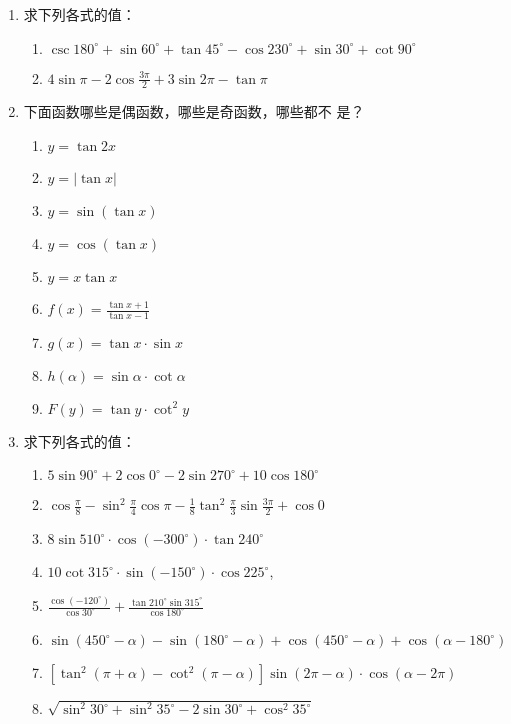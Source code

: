 \begin{enumerate}
\item 求下列各式的值：
\begin{enumerate}
    \item $\csc180^{\circ}+\sin60^{\circ}+\tan45^{\circ}-\cos230^{\circ}+\sin30^{\circ}
+\cot90^{\circ}$
    \item $4\sin\pi-2\cos\frac{3\pi}{2}+3\sin2\pi -\tan\pi$
\end{enumerate}

\item 下面函数哪些是偶函数，哪些是奇函数，哪些都不
是？
\begin{multicols}{2}
\begin{enumerate}
\item $y=\tan 2 x$
\item $y=|\tan x|$
\item $y=\sin (\tan  x)$ 
\item  $y=\cos (\tan x)$
\item $y=x \tan x$
\item $f(x)=\frac{\tan x+1}{\tan x-1}$
\item $g(x)=\tan x \cdot \sin x $
\item $ h(\alpha)=\sin \alpha \cdot \cot  \alpha$
\item  $F(y)=\tan y \cdot \cot^{2} y$
\end{enumerate}
\end{multicols}
\item  求下列各式的值：
\begin{enumerate}
\item $5 \sin 90^{\circ}+2 \cos 0^{\circ}-2 \sin 270^{\circ}+10 \cos 180^{\circ}$
\item $\cos \frac{\pi}{8}-\sin ^{2} \frac{\pi}{4}\cos \pi -\frac{1}{8} \tan^{2} \frac{\pi}{3} \sin \frac{3 \pi}{2}+\cos 0$
\item $8 \sin 510^{\circ} \cdot \cos \left(-300^{\circ}\right) \cdot \tan 240^{\circ}$
\item $10 \cot  315^{\circ} \cdot \sin \left(-150^{\circ}\right) \cdot \cos 225^{\circ}$,
\item $\frac{\cos \left(-120^{\circ}\right)}{\cos 30^{\circ}}+\frac{\tan 210^{\circ} \sin 315^{\circ}}{\cos 180^{\circ}}$
\item $\sin \left(450^{\circ}-\alpha\right)-\sin \left(180^{\circ}-\alpha\right) +\cos \left(450^{\circ}-\alpha\right)+\cos \left(\alpha-180^{\circ}\right)$
\item $[\tan^2(\pi+\alpha)-\cot^2(\pi-\alpha)]\sin(2\pi-\alpha)\cdot \cos(\alpha-2\pi)$
\item $\sqrt{\sin^2 30^{\circ}+\sin^2 35^{\circ}-2\sin 30^{\circ}+\cos^2 35^{\circ}}$
\end{enumerate}


\end{enumerate}
